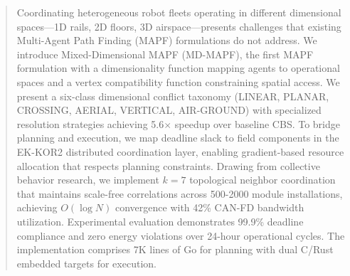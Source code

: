 \begin{abstract}
Coordinating heterogeneous robot fleets operating in different dimensional spaces—1D rails, 2D floors, 3D airspace—presents challenges that existing Multi-Agent Path Finding (MAPF) formulations do not address. We introduce Mixed-Dimensional MAPF (MD-MAPF), the first MAPF formulation with a dimensionality function mapping agents to operational spaces and a vertex compatibility function constraining spatial access. We present a six-class dimensional conflict taxonomy (LINEAR, PLANAR, CROSSING, AERIAL, VERTICAL, AIR-GROUND) with specialized resolution strategies achieving 5.6$\times$ speedup over baseline CBS. To bridge planning and execution, we map deadline slack to field components in the EK-KOR2 distributed coordination layer, enabling gradient-based resource allocation that respects planning constraints. Drawing from collective behavior research, we implement $k=7$ topological neighbor coordination that maintains scale-free correlations across 500-2000 module installations, achieving $O(\log N)$ convergence with 42\% CAN-FD bandwidth utilization. Experimental evaluation demonstrates 99.9\% deadline compliance and zero energy violations over 24-hour operational cycles. The implementation comprises 7K lines of Go for planning with dual C/Rust embedded targets for execution.
\end{abstract}
